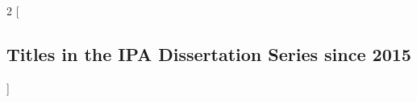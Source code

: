 \setlength{\columnsep}{2em}
\begin{multicols}{2}
        [\subsection*{Titles in the IPA Dissertation Series since 2015}]















\end{multicols}
